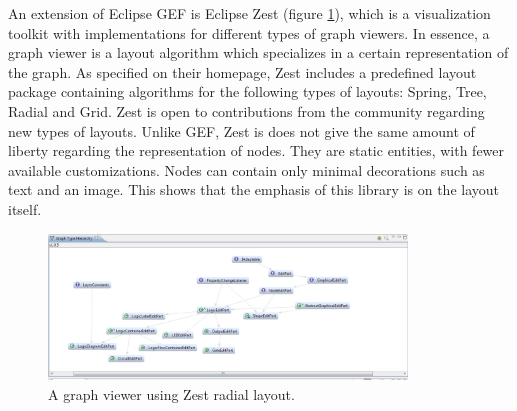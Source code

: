 An extension of Eclipse GEF is Eclipse Zest\cite{zestrelwork} (figure \ref{zest}), which is a visualization toolkit with implementations for different types of graph 
viewers. In essence, a graph viewer is a layout algorithm which specializes in a certain representation of the graph. As 
specified on their homepage, Zest includes a predefined layout package containing algorithms for the following types of 
layouts: Spring, Tree, Radial and Grid. Zest is open to contributions from the community regarding new types of layouts.
Unlike GEF, Zest is does not give the same amount of liberty regarding the representation of nodes. They are static entities, with 
fewer available customizations. Nodes can contain only minimal decorations such as text and an image. This shows that the emphasis 
of this library is on the layout itself.

\begin{figure}[ht] \centering
\includegraphics[width=0.85\textwidth]{img/relatedwork/zest.png}
\caption{A graph viewer using Zest radial layout.\protect\footnotemark \label{zest}} \end{figure}
